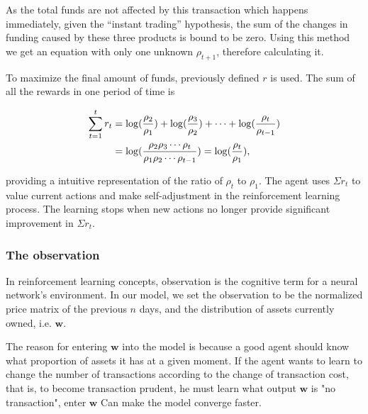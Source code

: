 \documentclass{mcmthesis}
\begin{document}
As the total funds are not affected by this transaction which happens immediately,
given the ``instant trading'' hypothesis,
the sum of the changes in funding caused by these three products is bound to be zero.
Using this method we get an equation with only one unknown $\rho _{t+1}$,
therefore calculating it.

To maximize the final amount of funds,
previously defined $r$ is used.
The sum of all the rewards in one period of time is


\begin{align}
  \sum_{t=1}^t r_t &= \log(\frac{\rho_2}{\rho_1}) + \log(\frac{\rho_3}{\rho_2}) + \cdots + \log(\frac{\rho_t}{\rho_{t-1}}) \notag \\
  &= \log(\frac{\rho_2 \rho_3 \cdots \rho_t}{\rho_1 \rho_2 \cdots \rho_{t-1}}) = \log(\frac{\rho_t}{\rho_1}),
\end{align}

providing a intuitive representation of the ratio of $\rho_t$ to $\rho_1$.
The agent uses $\Sigma r_t$ to value current actions and make self-adjustment
in the reinforcement learning process.
The learning stops when new actions no longer provide significant improvement in $\Sigma r_t$.

\subsubsection{The observation}


In reinforcement learning concepts, observation is the cognitive term for a neural network's environment. In our model, we set the observation to be the normalized price matrix of the previous $n$ days, and the distribution of assets currently owned, i.e. $\pmb{w}$.


The reason for entering $\pmb{w}$ into the model is because a good agent should know what proportion of assets it has at a given moment. If the agent wants to learn to change the number of transactions according to the change of transaction cost, that is, to become transaction prudent, he must learn what output $\pmb{w}$ is "no transaction", enter $\pmb{w}$ Can make the model converge faster.
\end{document}
